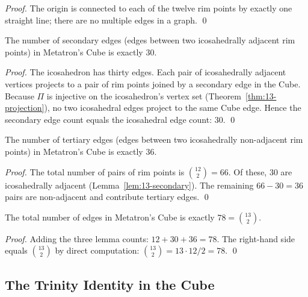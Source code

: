 \begin{proof}
The origin is connected to each of the twelve rim points by exactly
one straight line; there are no multiple edges in a graph. \qed
\end{proof}

\begin{lemma}
\label{lem:13-secondary}
The number of secondary edges (edges between two icosahedrally
adjacent rim points) in Metatron's Cube is exactly $30$.
\end{lemma}

\begin{proof}
The icosahedron has thirty edges. Each pair of icosahedrally
adjacent vertices projects to a pair of rim points joined by a
secondary edge in the Cube. Because $\Pi$ is injective on the
icosahedron's vertex set (Theorem~\ref{thm:13-projection}), no two
icosahedral edges project to the same Cube edge. Hence the
secondary edge count equals the icosahedral edge count: $30$. \qed
\end{proof}

\begin{lemma}
\label{lem:13-tertiary}
The number of tertiary edges (edges between two icosahedrally
non-adjacent rim points) in Metatron's Cube is exactly $36$.
\end{lemma}

\begin{proof}
The total number of pairs of rim points is $\binom{12}{2} = 66$.
Of these, $30$ are icosahedrally adjacent (Lemma~\ref{lem:13-secondary}).
The remaining $66 - 30 = 36$ pairs are non-adjacent and contribute
tertiary edges. \qed
\end{proof}

\begin{theorem}
\label{thm:13-total-edges}
The total number of edges in Metatron's Cube is exactly $78 =
\binom{13}{2}$.
\end{theorem}

\begin{proof}
Adding the three lemma counts: $12 + 30 + 36 = 78$. The
right-hand side equals $\binom{13}{2}$ by direct computation:
$\binom{13}{2} = 13 \cdot 12 / 2 = 78$. \qed
\end{proof}

\subsection{The Trinity Identity in the Cube}
\label{sec:13-trinity-bookkeeping}

